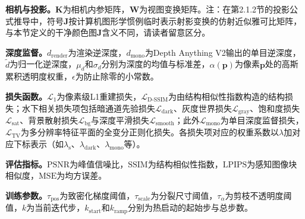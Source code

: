 \textbf{相机与投影。}$\mathbf{K}$为相机内参矩阵，$\mathbf{W}$为视图变换矩阵。注：在第2.1.2节的投影公式推导中，符号$\mathbf{J}$按计算机图形学惯例临时表示射影变换的仿射近似雅可比矩阵，与本节定义的干净颜色图$\mathbf{J}$含义不同，请读者留意区分。

\textbf{深度监督。}$d_{\mathrm{render}}$为渲染逆深度，$d_{\mathrm{mono}}$为Depth Anything V2输出的单目逆深度，$\tilde{d}$为归一化逆深度，$\mu_d$和$\sigma_d$分别为深度的均值与标准差，$\alpha(\mathbf{p})$为像素$\mathbf{p}$处的高斯累积透明度权重，$\epsilon$为防止除零的小常数。

\textbf{损失函数。}$\mathcal{L}_1$为像素级L1重建损失，$\mathcal{L}_{\mathrm{D}\mbox{-}\mathrm{SSIM}}$为由结构相似性指数构造的结构损失；水下相关损失项包括暗通道先验损失$\mathcal{L}_{\mathrm{dark}}$、灰度世界损失$\mathcal{L}_{\mathrm{gray}}$、饱和度损失$\mathcal{L}_{\mathrm{sat}}$、背景散射损失$\mathcal{L}_{\mathrm{bg}}$与深度平滑损失$\mathcal{L}_{\mathrm{smooth}}$；此外$\mathcal{L}_{\mathrm{mono}}$为单目深度监督损失，$\mathcal{L}_{\mathrm{TV}}$为多分辨率特征平面的全变分正则化损失。各损失项对应的权重系数以$\lambda$加对应下标表示（如$\lambda_{\mathrm{s}}$、$\lambda_{\mathrm{dark}}$、$\lambda_{\mathrm{mono}}$等）。

\textbf{评估指标。}$\mathrm{PSNR}$为峰值信噪比，$\mathrm{SSIM}$为结构相似性指数，$\mathrm{LPIPS}$为感知图像块相似度，$\mathrm{MSE}$为均方误差。

\textbf{训练参数。}$\tau_{\mathrm{pos}}$为致密化梯度阈值，$\tau_{\mathrm{scale}}$为分裂尺寸阈值，$\tau_{\alpha}$为剪枝不透明度阈值，$k$为当前迭代步，$k_{\mathrm{start}}$和$k_{\mathrm{ramp}}$分别为热启动的起始步与总步数。
